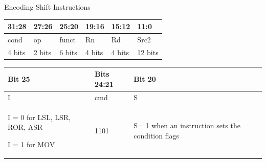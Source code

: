 \documentclass[aspectratio=169]{beamer}
\begin{document}
\begin{frame}{Encoding Shift Instructions}
    
    \begin{center}
        \begin{tabular}{|p{4em}|p{4em}|p{4em}|p{4em}|p{4em}|p{4em}|}
        \hline
        31:28 & 27:26 & 25:20 & 19:16 & 15:12 & 11:0 \\
        \hline
        cond & op & funct & Rn & Rd & Src2 \\
        \hline
        4 bits & 2 bits & 6 bits & 4 bits & 4 bits & 12 bits \\
        \hline
        \end{tabular}
    
        \vspace{0.5cm}
    
        \begin{tabular}{|p{13em}|p{9em}|p{11em}|}
            \hline
            Bit 25 & Bits 24:21 & Bit 20\\
            \hline
            I & cmd & S \\
            \hline
            I = 0 for LSL, LSR, ROR, ASR 
            
            I = 1 for MOV
            & 1101 & S= 1 when an instruction sets the condition flags\\
            \hline
        \end{tabular}
    \end{center}

\end{frame}
\end{document}
